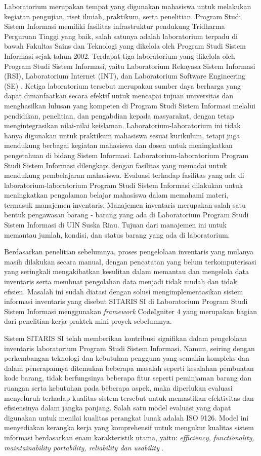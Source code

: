 Laboratorium merupakan tempat yang digunakan mahasiswa untuk melakukan kegiatan pengujian, riset ilmiah, praktikum, serta penelitian. Program Studi Sistem Informasi memiliki fasilitas infrastruktur pendukung Tridharma Perguruan Tinggi yang baik, salah satunya adalah laboratorium terpadu di bawah Fakultas Sains dan Teknologi yang dikelola oleh Program Studi Sistem Informasi sejak tahun 2002. Terdapat tiga laboratorium yang dikelola oleh Program Studi Sistem Informasi, yaitu Laboratorium Rekayasa Sistem Informasi (RSI), Laboratorium Internet (INT), dan Laboratorium Software Engineering (SE) \cite{lab-si-website}. Ketiga laboratorium tersebut merupakan sumber daya berharga yang dapat dimanfaatkan secara efektif untuk mencapai tujuan universitas dan menghasilkan lulusan yang kompeten di Program Studi Sistem Informasi melalui pendidikan, penelitian, dan pengabdian kepada masyarakat, dengan tetap mengintegrasikan nilai-nilai keislaman. Laboratorium-laboratorium ini tidak hanya digunakan untuk praktikum mahasiswa sesuai kurikulum, tetapi juga mendukung berbagai kegiatan mahasiswa dan dosen untuk meningkatkan pengetahuan di bidang Sistem Informasi. Laboratorium-laboratorium Program Studi Sistem Informasi dilengkapi dengan fasilitas yang memadai untuk mendukung pembelajaran mahasiswa. Evaluasi terhadap fasilitas yang ada di laboratorium-laboratorium Program Studi Sistem Informasi dilakukan untuk meningkatkan pengalaman belajar mahasiswa dalam memahami materi, termasuk manajemen inventaris. Manajemen inventaris merupakan salah satu bentuk pengawasan barang - barang yang ada di Laboratorium Program Studi Sistem Informasi di UIN Suska Riau. Tujuan dari manajemen ini untuk memantau jumlah, kondisi, dan status barang yang ada di laboratorium. 

Berdasarkan penelitian sebelumnya, proses pengelolaan inventaris yang mulanya masih dilakukan secara manual, dengan pencatatan yang belum terkomputerisasi yang seringkali mengakibatkan kesulitan dalam memantau dan mengelola data inventaris serta membuat pengolahan data menjadi tidak mudah dan tidak efisien. Masalah ini sudah diatasi dengan solusi mengimplementasikan sistem informasi inventaris yang disebut SITARIS SI di Laboratorium Program Studi Sistem Informasi menggunakan \textit{framework} CodeIgniter 4 yang merupakan bagian dari penelitian kerja praktek mini proyek sebelumnya. 

Sistem SITARIS SI telah memberikan kontribusi signifikan dalam pengelolaan inventaris laboratorium Program Studi Sistem Informasi. Namun, seiring dengan perkembangan teknologi dan kebutuhan pengguna yang semakin kompleks dan dalam penerapannya ditemukan beberapa masalah seperti kesalahan pembuatan kode barang, tidak berfungsinya beberapa fitur seperti peminjaman barang dan ruangan serta kebutuhan pada beberapa aspek, maka diperlukan evaluasi menyeluruh terhadap kualitas sistem tersebut untuk memastikan efektivitas dan efisiensinya dalam jangka panjang. Salah satu model evaluasi yang dapat digunakan untuk menilai kualitas perangkat lunak adalah ISO 9126. Model ini menyediakan kerangka kerja yang komprehensif untuk mengukur kualitas sistem informasi berdasarkan enam karakteristik utama, yaitu: \textit{efficiency, functionality, maintainability portability, reliability dan usability} \cite{iso2001iec}.

